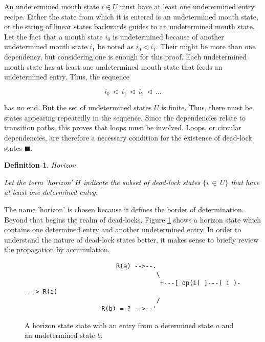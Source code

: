 \documentclass[12pt,a4paper]{scrartcl}
\newtheorem{definition}{Definition}
\begin{document}
An undetermined mouth state $i \in U$ must have at least one undetermined entry
recipe. Either the state from which it is entered is an undetermined mouth state, 
or the string of linear states backwards guides to an undetermined mouth state. 
Let the fact that a mouth state $i_0$ is undetermined because of another
undetermined mouth state $i_1$ be noted as $i_0 \vartriangleleft i_1$. Their might
be more than one dependency, but considering one is enough for this proof. Each
undetermined mouth state has at least one undetermined mouth state that feeds
an undetermined entry. Thus, the sequence 

\begin{equation}
    i_0\,\vartriangleleft\,i_1\,\vartriangleleft\,i_2\,\vartriangleleft\,\ldots
\end{equation}

has no end. But the set of undetermined states $U$ is finite. Thus, there must
be states appearing repeatedly in the sequence. Since the dependencies relate
to transition paths, this proves that loops must be involved. Loops, or circular
dependencies, are therefore a necessary condition for the existence of
dead-lock states $\blacksquare$. 

\begin{definition}
Horizon

Let the term 'horizon' $H$ indicate the subset of dead-lock states $\{
i\,\in\,U \}$ that have at least one determined entry.  
\end{definition}

The name 'horizon' is chosen because it defines the border of determination.
Beyond that begins the realm of dead-locks. Figure \ref{fig:horizon-state}
shows a horizon state which contains one determined entry and another
undetermined entry.  In order to understand the nature of dead-lock states
better, it makes sense to briefly review the propagation by accumulation.

\begin{figure}[htbp] \leavevmode \label{fig:horizon-state}
\begin{verbatim}
                         R(a) -->--.
                                    \
                                     +---[ op(i) ]---( i )----> R(i)
                                    /
                     R(b) = ? -->--'

\end{verbatim}
\caption{A horizon state state with an entry from a determined state $a$ and 
    an undetermined state $b$.}
\end{figure}
\end{document}
